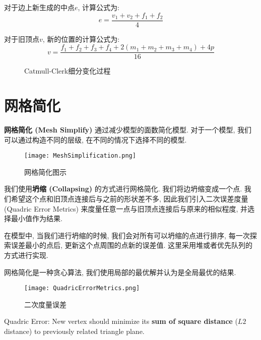 对于边上新生成的中点$e$, 计算公式为:
\begin{equation}
	e=\frac{v_1+v_2+f_1+f_2}{4}
\end{equation}

对于旧顶点$v$, 新的位置的计算公式为: 
\begin{equation}
	v=\frac{f_1+f_2+f_3+f_4+2(m_1+m_2+m_3+m_4)+4p}{16}
\end{equation}


\begin{figure}[htbp]
	\centering
	\caption{Catmull-Clerk细分变化过程}
	\label{fig:Catmull_2}
\end{figure}


\section{网格简化}
\textbf{网格简化 (Mesh Simplify) }通过减少模型的面数简化模型. 对于一个模型, 我们可以通过构造不同的层级, 在不同的情况下选择不同的模型. 

\begin{figure}[H]
	\centering
	\texttt{[image: MeshSimplification.png]}
	\caption{网格简化图示}
	\label{fig:MeshSimplification}
\end{figure}

我们使用\textbf{坍缩 (Collapsing) }的方式进行网格简化. 我们将边坍缩变成一个点. 我们希望这个点和旧顶点连接后与之前的形状差不多, 因此我们引入二次误差度量 (Quadric Error Metrics) 来度量任意一点与旧顶点连接后与原来的相似程度, 并选择最小值作为结果. 

在模型中, 当我们进行坍缩的时候, 我们会对所有可以坍缩的点进行排序, 每一次探索误差最小的点后, 更新这个点周围的点新的误差值. 这里采用堆或者优先队列的方式进行实现. 

网格简化是一种贪心算法, 我们使用局部的最优解并认为是全局最优的结果. 

\begin{figure}[H]
	\centering
	\texttt{[image: QuadricErrorMetrics.png]}
	\caption{二次度量误差}
	\label{fig:QuadricErrorMetrics}
\end{figure}

Quadric Error: New vertex should minimize its \textbf{sum of square distance} ($L2$ distance)
to previously related triangle plane.
